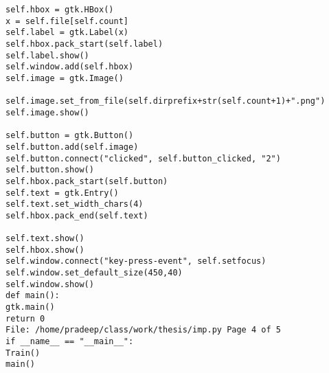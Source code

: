 \begin{verbatim}
self.hbox = gtk.HBox()
x = self.file[self.count]
self.label = gtk.Label(x)
self.hbox.pack_start(self.label)
self.label.show()
self.window.add(self.hbox)
self.image = gtk.Image()

self.image.set_from_file(self.dirprefix+str(self.count+1)+".png")
self.image.show()

self.button = gtk.Button()
self.button.add(self.image)
self.button.connect("clicked", self.button_clicked, "2")
self.button.show()
self.hbox.pack_start(self.button)
self.text = gtk.Entry()
self.text.set_width_chars(4)
self.hbox.pack_end(self.text)

self.text.show()
self.hbox.show()
self.window.connect("key-press-event", self.setfocus)
self.window.set_default_size(450,40)
self.window.show()
def main():
gtk.main()
return 0
File: /home/pradeep/class/work/thesis/imp.py Page 4 of 5
if __name__ == "__main__":
Train()
main()
\end{verbatim}


